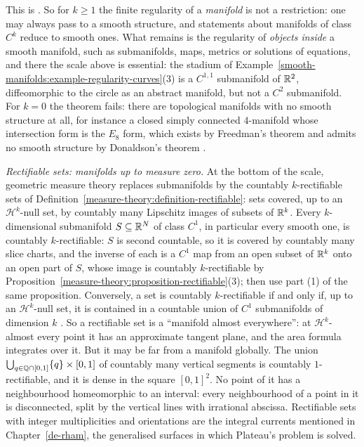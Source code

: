 This is \cite[Chapter 2, Section 2]{hirsch-differential-topology}. So for $k \geq 1$ the finite regularity of a \emph{manifold} is not a restriction: one may always pass to a smooth structure, and statements about
manifolds of class $C^k$ reduce to smooth ones. What remains is the regularity of \emph{objects inside} a smooth manifold, such as submanifolds, maps, metrics or solutions of equations, and there the scale above is
essential: the stadium of Example~\ref{smooth-manifolds:example-regularity-curves}(3) is a $C^{1,1}$ submanifold of $\mathbb{R}^2$, diffeomorphic to the circle as an abstract manifold, but not a $C^2$ submanifold. For
$k = 0$ the theorem fails: there are topological manifolds with no smooth structure at all, for instance a closed simply connected $4$-manifold whose intersection form is the $E_8$ form, which exists by Freedman's
theorem \cite{freedman-1982} and admits no smooth structure by Donaldson's theorem \cite{donaldson-1983}.

\begin{remark}\label{smooth-manifolds:remark-rectifiable}
\emph{Rectifiable sets: manifolds up to measure zero.} At the bottom of the scale, geometric measure theory replaces submanifolds by the countably $k$-rectifiable sets of
Definition~\ref{measure-theory:definition-rectifiable}: sets covered, up to an $\mathcal{H}^k$-null set, by countably many Lipschitz images of subsets of $\mathbb{R}^k$. Every $k$-dimensional submanifold $S \subseteq \mathbb{R}^N$ of
class $C^1$, in particular every smooth one, is countably $k$-rectifiable: $S$ is second countable, so it is covered by countably many slice charts, and the inverse of each is a $C^1$ map from an open subset of $\mathbb{R}^k$
onto an open part of $S$, whose image is countably $k$-rectifiable by Proposition~\ref{measure-theory:proposition-rectifiable}(3); then use part (1) of the same proposition. Conversely, a set is countably
$k$-rectifiable if and only if, up to an $\mathcal{H}^k$-null set, it is contained in a countable union of $C^1$ submanifolds of dimension $k$ \cite[3.2.29]{federer-gmt}. So a rectifiable set is a ``manifold
almost everywhere'': at $\mathcal{H}^k$-almost every point it has an approximate tangent plane, and the area formula integrates over it. But it may be far from a manifold globally. The union
$\bigcup_{q \in \mathbb{Q} \cap [0, 1]}\{q\} \times [0, 1]$ of countably many vertical segments is countably $1$-rectifiable, and it is dense in the square $[0, 1]^2$. No point of it has a neighbourhood homeomorphic to an
interval: every neighbourhood of a point in it is disconnected, split by the vertical lines with irrational abscissa. Rectifiable sets with integer multiplicities and orientations are the integral currents mentioned in Chapter~\ref{de-rham}, the generalised surfaces in which Plateau's problem
is solved.
\end{remark}

